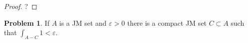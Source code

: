 \documentclass[20pt]{article}
\theoremstyle{plain}
\theoremstyle{definition}
\newtheorem*{problem}{Problem}
\begin{document}
\begin{proof}
\color{ForestGreen} ?
\end{proof}

\begin{problem}{3.22}
  If $A$ is a JM set and $\varepsilon > 0$ there is a compact JM set $C \subset A$
  such that $\int_{A-C}1 < \varepsilon.$ 
\end{problem}


\end{document}
